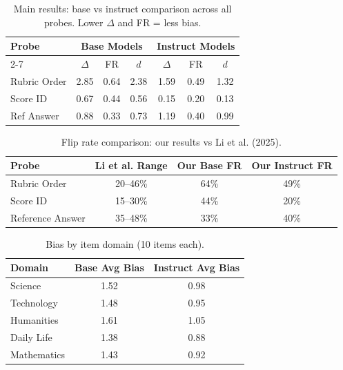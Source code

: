 \begin{table}[h]
\centering\small
\caption{Main results: base vs instruct comparison across all probes. Lower $\Delta$ and FR = less bias.}
\label{tab:main}
\begin{tabular}{|l|c|c|c|c|c|c|}
\hline
\multirow{2}{*}{Probe} & \multicolumn{3}{c|}{Base Models} & \multicolumn{3}{c|}{Instruct Models} \\
\cline{2-7}
 & $\Delta$ & FR & $d$ & $\Delta$ & FR & $d$ \\
\hline
Rubric Order & 2.85 & 0.64 & 2.38 & 1.59 & 0.49 & 1.32 \\
Score ID & 0.67 & 0.44 & 0.56 & 0.15 & 0.20 & 0.13 \\
Ref Answer & 0.88 & 0.33 & 0.73 & 1.19 & 0.40 & 0.99 \\
\hline
\end{tabular}
\end{table}

\begin{table}[h]
\centering\small
\caption{Flip rate comparison: our results vs Li et al. (2025).}
\label{tab:compare}
\begin{tabular}{lccc}
\toprule
Probe & Li et al. Range & Our Base FR & Our Instruct FR \\
\midrule
Rubric Order & 20--46\% & 64\% & 49\% \\
Score ID & 15--30\% & 44\% & 20\% \\
Reference Answer & 35--48\% & 33\% & 40\% \\
\bottomrule
\end{tabular}
\end{table}

\begin{table}[h]
\centering\small
\caption{Bias by item domain (10 items each).}
\label{tab:domain}
\begin{tabular}{lcc}
\toprule
Domain & Base Avg Bias & Instruct Avg Bias \\
\midrule
Science & 1.52 & 0.98 \\
Technology & 1.48 & 0.95 \\
Humanities & 1.61 & 1.05 \\
Daily Life & 1.38 & 0.88 \\
Mathematics & 1.43 & 0.92 \\
\bottomrule
\end{tabular}
\end{table}

